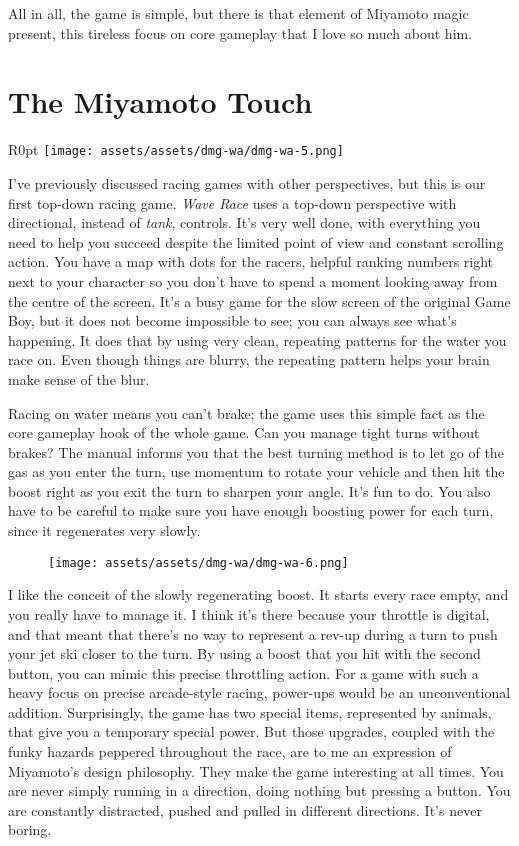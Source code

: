 \documentclass{book}
\begin{document}
All in all, the game is simple, but there is that element of Miyamoto magic present, this tireless focus on core gameplay that I love so much about him.

\FloatBarrier\needspace{10mm}\section*{The Miyamoto Touch}\nopagebreak[4]

\begin{wrapfigure}{R}{0pt} \texttt{[image: assets/assets/dmg-wa/dmg-wa-5.png]}\end{wrapfigure}
I’ve previously discussed racing games with other perspectives, but this is our first top-down racing game. \emph{Wave Race} uses a top-down perspective with directional, instead of \emph{tank}, controls. It’s very well done, with everything you need to help you succeed despite the limited point of view and constant scrolling action. You have a map with dots for the racers, helpful ranking numbers right next to your character so you don’t have to spend a moment looking away from the centre of the screen. It’s a busy game for the slow screen of the original Game Boy, but it does not become impossible to see; you can always see what’s happening. It does that by using very clean, repeating patterns for the water you race on. Even though things are blurry, the repeating pattern helps your brain make sense of the blur.

Racing on water means you can’t brake; the game uses this simple fact as the core gameplay hook of the whole game. Can you manage tight turns without brakes? The manual informs you that the best turning method is to let go of the gas as you enter the turn, use momentum to rotate your vehicle and then hit the boost right as you exit the turn to sharpen your angle. It’s fun to do. You also have to be careful to make sure you have enough boosting power for each turn, since it regenerates very slowly.

\begin{figure}[hbt]
\vskip 10pt
\centering \texttt{[image: assets/assets/dmg-wa/dmg-wa-6.png]}
\vskip 6pt
\end{figure}

I like the conceit of the slowly regenerating boost. It starts every race empty, and you really have to manage it. I think it’s there because your throttle is digital, and that meant that there’s no way to represent a rev-up during a turn to push your jet ski closer to the turn. By using a boost that you hit with the second button, you can mimic this precise throttling action. For a game with such a heavy focus on precise arcade-style racing, power-ups would be an unconventional addition. Surprisingly, the game has two special items, represented by animals, that give you a temporary special power. But those upgrades, coupled with the funky hazards peppered throughout the race, are to me an expression of Miyamoto’s design philosophy. They make the game interesting at all times. You are never simply running in a direction, doing nothing but pressing a button. You are constantly distracted, pushed and pulled in different directions. It’s never boring.
\end{document}
